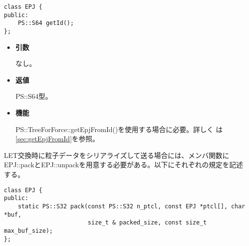 \label{sec:EPJ:getId}

\begin{screen}
\begin{verbatim}
class EPJ {
public:
    PS::S64 getId();
};
\end{verbatim}
\end{screen}

\begin{itemize}

\item {\bf 引数}

なし。

\item {\bf 返値}

PS::S64型。
  
\item {\bf 機能}

PS::TreeForForce::getEpjFromId()を使用する場合に必要。詳しく
は\ref{sec:getEpjFromId}を参照。


\end{itemize}


\label{sec:EPJ:serialize}

LET交換時に粒子データをシリアライズして送る場合には、メンバ関数に
EPJ::packとEPJ::unpackを用意する必要がある。以下にそれぞれの規定を記述
する。



\begin{screen}
\begin{verbatim}
class EPJ {
public:
    static PS::S32 pack(const PS::S32 n_ptcl, const EPJ *ptcl[], char *buf, 
                        size_t & packed_size, const size_t max_buf_size);
};
\end{verbatim}
\end{screen}

